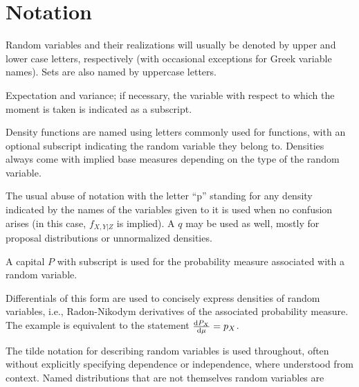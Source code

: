 \chapter*{Notation}
\label{cha:notation}

\begin{symbolicfootnotes}
  \begin{description}[style=nextline, leftmargin=4cm]
  \item[\(\Prob{\Theta \in A \given X = x}\)] Random variables and their realizations will usually be
    denoted by upper and lower case letters, respectively (with occasional exceptions for Greek
    variable names).  Sets are also named by uppercase letters.
  \item[{\(\Exp{X}, \Var[X]{f(X, Y)}\)}] Expectation and variance; if necessary, the variable with
    respect to which the moment is taken is indicated as a subscript.
  \item[\(\phi(x), f_{Z}(x)\)] Density functions are named using letters commonly used for functions,
    with an optional subscript indicating the random variable they belong to.  Densities always come
    with implied base measures depending on the type of the random variable.
  \item[\(\prob{x, y \given z}\)] The usual abuse of notation with the letter \enquote{p} standing for
    any density indicated by the names of the variables given to it is used when no confusion arises
    (in this case, \(f_{X,Y|Z}\) is implied).  A \(q\) may be used as well, mostly for proposal
    distributions or unnormalized densities.
  \item[{\(\Prob{X \in A} = P_{X}(A) = \int_{A} p_{X}(x) \dif\mu(x)\)}] A capital \(P\) with subscript
    is used for the probability measure associated with a random variable.
  \item[\(\Prob{X \in \dif x} = P_{X}(\dif x) = p_{X}(x) \dif\mu(x)\)] Differentials of this form
    are used to concisely express densities of random variables, i.e., Radon-Nikodym derivatives of
    the associated probability measure.  The example is equivalent to the statement
    \(\frac{\mathop{}\!\mathrm{d} P_{X}}{\mathop{}\!\mathrm{d} \mu} = p_{X}\).
  \item[{\(X_{i} \from \distr{Normal}(\mu, \sigma)\)}] The tilde notation for describing random
    variables is used throughout, often without explicitly specifying dependence or independence,
    where understood from context.  Named distributions that are not themselves random variables are

\end{description}
\end{symbolicfootnotes}
